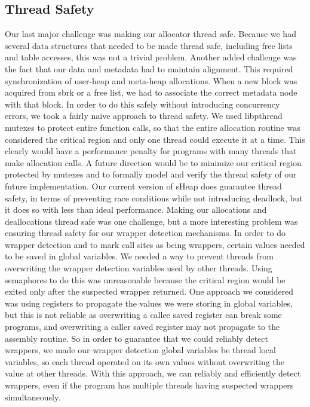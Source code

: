 \documentclass[conference]{IEEEtran}
\begin{document}
\subsection{Thread Safety}
Our last major challenge was making our allocator thread safe. Because we had several 
data structures that needed to be made thread safe, including free lists and table 
accesses, this was not a trivial problem. Another added challenge was the fact that our 
data and metadata had to maintain alignment. This required synchronization of user-heap 
and meta-heap allocations. When a new block was acquired from sbrk or a free list, we 
had to associate the correct metadata node with that block. In order to do this safely 
without introducing concurrency errors, we took a fairly naive approach to thread safety. 
We used libpthread mutexes to protect entire function calls, so that the entire allocation 
routine was considered the critical region and only one thread could execute it at a time. 
This clearly would have a performance penalty for programs with many threads that make 
allocation calls. A future direction would be to minimize our critical region protected 
by mutexes and to formally model and verify the thread safety of our future implementation. 
Our current version of sHeap does guarantee thread safety, in terms of preventing race conditions while not introducing deadlock, but it does so with less than ideal performance. Making our allocations and deallocations 
thread safe was one challenge, but a more interesting problem was ensuring thread safety for our 
wrapper detection mechanisms. In order to do wrapper detection and to mark call sites as 
being wrappers, certain values needed to be saved in global variables. We needed a way to 
prevent threads from overwriting the wrapper detection variables used by other threads. 
Using semaphores to do this was unreasonable because the critical region would be exited 
only after the suspected wrapper returned. One approach we considered was using registers 
to propagate the values we were storing in global variables, but this is not reliable as 
overwriting a callee saved register can break some programs, and overwriting a caller 
saved register may not propagate to the assembly routine. So in order to guarantee that 
we could reliably detect wrappers, we made our wrapper detection global variables be thread 
local variables, so each thread operated on its own values without overwriting the value 
at other threads.  With this approach, we can reliably and efficiently detect wrappers, 
even if the program has multiple threads having suspected wrappers simultaneously.
\end{document}
